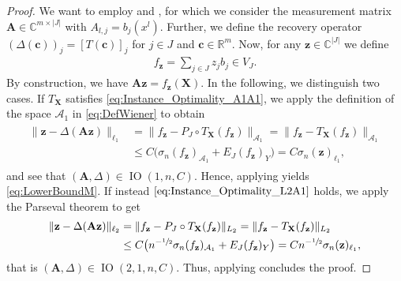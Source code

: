 \documentclass[11pt,reqno, a4paper]{article}
\numberwithin{equation}{section}
\newcommand{\C}{\mathbb{C}}
\begin{document}
\begin{proof}
We want to employ  and , for which we consider the measurement matrix $\mathbf{A}\in\C^{m\times\lvert J\rvert}$ with $A_{l,j}= b_j(x^l)$.
Further, we define the recovery operator $(\Delta(\mathbf{c}))_j=[T(\mathbf{c})]_j$ for $j\in J$ and $\mathbf{c}\in\mathbb{R}^m$. Now, for any $\mathbf{z}\in\C^{\lvert J\rvert}$ we define
\begin{gather}
f_\mathbf{z} = \sum\limits_{j\in J} z_jb_j\in V_J.
\end{gather}
By construction, we have $\mathbf{Az} = f_{\mathbf z}(\mathbf X)$.
In the following, we distinguish two cases.
If $T_{\mathbf{X}}$ satisfies \eqref{eq:Instance_Optimality_A1A1}, we apply the definition of the space $\mathcal{A}_1$ in \eqref{eq:DefWiener} to obtain
\begin{align}\label{vec2fct_A1A1}
\begin{split}
\lVert \mathbf{z} - \Delta(\mathbf{A}\mathbf{z}) \rVert_{\ell_1} &= \lVert f_{\mathbf{z}} - P_J \circ T_{\mathbf{X}}(f_{\mathbf{z}})\rVert_{\mathcal{A}_1} =\lVert f_{\mathbf{z}} - T_{\mathbf{X}}(f_{\mathbf{z}})\rVert_{\mathcal{A}_1}\\
&\leq C \big(\sigma_n(f_{\mathbf{z}})_{\mathcal{A}_1}+E_J(f_{\mathbf{z}})_Y\big) = C\sigma_n(\mathbf{z})_{\ell_1},
\end{split}
\end{align}
and see that $(\mathbf{A},\Delta)\in\operatorname{IO}(1,n,C)$.
Hence, applying  yields \eqref{eq:LowerBoundM}.
If instead $\eqref{eq:Instance_Optimality_L2A1}$ holds, we apply the Parseval theorem to get
\begin{align}\label{vec2fct}
\begin{split}
\lVert \mathbf{z} - \Delta(\mathbf{A}\mathbf{z}) \rVert_{\ell_2} &= \lVert f_{\mathbf{z}} - P_J \circ T_{\mathbf{X}}(f_{\mathbf{z}})\rVert_{L_2} = \lVert f_{\mathbf{z}} - T_{\mathbf{X}}(f_{\mathbf{z}}) \rVert_{L_2}\\
&\leq C\bigl(n^{-\sfrac{1}{2}}\sigma_n(f_{\mathbf{z}})_{\mathcal{A}_1} + E_J(f_{\mathbf{z}})_Y\bigr) = Cn^{-\sfrac{1}{2}}\sigma_n(\mathbf{z})_{\ell_1},
\end{split}
\end{align}
that is $(\mathbf{A},\Delta)\in\operatorname{IO}(2,1,n,C)$.
Thus, applying  concludes the proof.
\end{proof}
\end{document}
